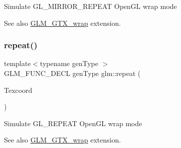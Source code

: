 Simulate G\+L\+\_\+\+M\+I\+R\+R\+O\+R\+\_\+\+R\+E\+P\+E\+AT Open\+GL wrap mode \begin{DoxySeeAlso}{See also}
\hyperlink{group__gtx__wrap}{G\+L\+M\+\_\+\+G\+T\+X\+\_\+wrap} extension. 
\end{DoxySeeAlso}
\mbox{\label{group__gtx__wrap_ga809650c6310ea7c42666e918c117fb6f}} 
\subsubsection{\texorpdfstring{repeat()}{repeat()}}
{\footnotesize\ttfamily template$<$typename gen\+Type $>$ \\
G\+L\+M\+\_\+\+F\+U\+N\+C\+\_\+\+D\+E\+CL gen\+Type glm\+::repeat (\begin{DoxyParamCaption}\item[{gen\+Type const \&}]{Texcoord }\end{DoxyParamCaption})}

Simulate G\+L\+\_\+\+R\+E\+P\+E\+AT Open\+GL wrap mode \begin{DoxySeeAlso}{See also}
\hyperlink{group__gtx__wrap}{G\+L\+M\+\_\+\+G\+T\+X\+\_\+wrap} extension. 
\end{DoxySeeAlso}
